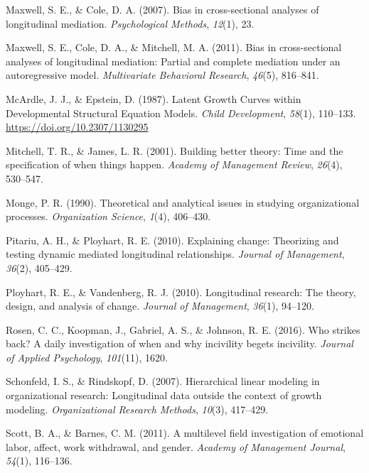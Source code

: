 \documentclass[english,,man]{apa6}
\begin{document}
\leavevmode\hypertarget{ref-maxwell2007bias}{}%
Maxwell, S. E., \& Cole, D. A. (2007). Bias in cross-sectional analyses of longitudinal mediation. \emph{Psychological Methods}, \emph{12}(1), 23.

\leavevmode\hypertarget{ref-maxwell2011bias}{}%
Maxwell, S. E., Cole, D. A., \& Mitchell, M. A. (2011). Bias in cross-sectional analyses of longitudinal mediation: Partial and complete mediation under an autoregressive model. \emph{Multivariate Behavioral Research}, \emph{46}(5), 816--841.

\leavevmode\hypertarget{ref-mcardle_latent_1987}{}%
McArdle, J. J., \& Epstein, D. (1987). Latent Growth Curves within Developmental Structural Equation Models. \emph{Child Development}, \emph{58}(1), 110--133. \url{https://doi.org/10.2307/1130295}

\leavevmode\hypertarget{ref-mitchell_building_2001}{}%
Mitchell, T. R., \& James, L. R. (2001). Building better theory: Time and the specification of when things happen. \emph{Academy of Management Review}, \emph{26}(4), 530--547.

\leavevmode\hypertarget{ref-monge_theoretical_1990}{}%
Monge, P. R. (1990). Theoretical and analytical issues in studying organizational processes. \emph{Organization Science}, \emph{1}(4), 406--430.

\leavevmode\hypertarget{ref-pitariu_explaining_2010}{}%
Pitariu, A. H., \& Ployhart, R. E. (2010). Explaining change: Theorizing and testing dynamic mediated longitudinal relationships. \emph{Journal of Management}, \emph{36}(2), 405--429.

\leavevmode\hypertarget{ref-ployhart_longitudinal_2010}{}%
Ployhart, R. E., \& Vandenberg, R. J. (2010). Longitudinal research: The theory, design, and analysis of change. \emph{Journal of Management}, \emph{36}(1), 94--120.

\leavevmode\hypertarget{ref-rosen_who_2016}{}%
Rosen, C. C., Koopman, J., Gabriel, A. S., \& Johnson, R. E. (2016). Who strikes back? A daily investigation of when and why incivility begets incivility. \emph{Journal of Applied Psychology}, \emph{101}(11), 1620.

\leavevmode\hypertarget{ref-schonfeld2007hierarchical}{}%
Schonfeld, I. S., \& Rindskopf, D. (2007). Hierarchical linear modeling in organizational research: Longitudinal data outside the context of growth modeling. \emph{Organizational Research Methods}, \emph{10}(3), 417--429.

\leavevmode\hypertarget{ref-scott_multilevel_2011}{}%
Scott, B. A., \& Barnes, C. M. (2011). A multilevel field investigation of emotional labor, affect, work withdrawal, and gender. \emph{Academy of Management Journal}, \emph{54}(1), 116--136.
\end{document}
